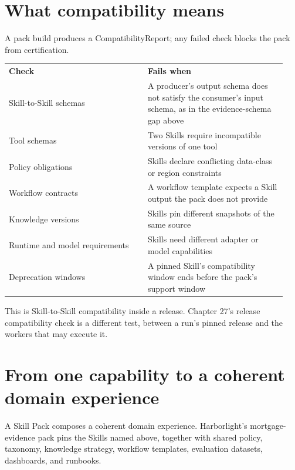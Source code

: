 \section{What compatibility means}

A pack build produces a CompatibilityReport; any failed check blocks the pack from certification.\par

\BookTableStart
\small
\begin{tabular}{@{}Y{0.4700\linewidth}Y{0.4700\linewidth}@{}}
\color{white}\bfseries \textbf{Check} & \color{white}\bfseries \textbf{Fails when} \\
Skill-to-Skill schemas & A producer's output schema does not satisfy the consumer's input schema, as in the evidence-schema gap above \\
Tool schemas & Two Skills require incompatible versions of one tool \\
Policy obligations & Skills declare conflicting data-class or region constraints \\
Workflow contracts & A workflow template expects a Skill output the pack does not provide \\
Knowledge versions & Skills pin different snapshots of the same source \\
Runtime and model requirements & Skills need different adapter or model capabilities \\
Deprecation windows & A pinned Skill's compatibility window ends before the pack's support window \\
\end{tabular}
\BookTableEnd

This is Skill-to-Skill compatibility inside a release. Chapter 27's release compatibility check is a different test, between a run's pinned release and the workers that may execute it.\par

\section{From one capability to a coherent domain experience}

A Skill Pack composes a coherent domain experience. Harborlight’s mortgage-evidence pack pins the Skills named above, together with shared policy, taxonomy, knowledge strategy, workflow templates, evaluation datasets, dashboards, and runbooks.\par

